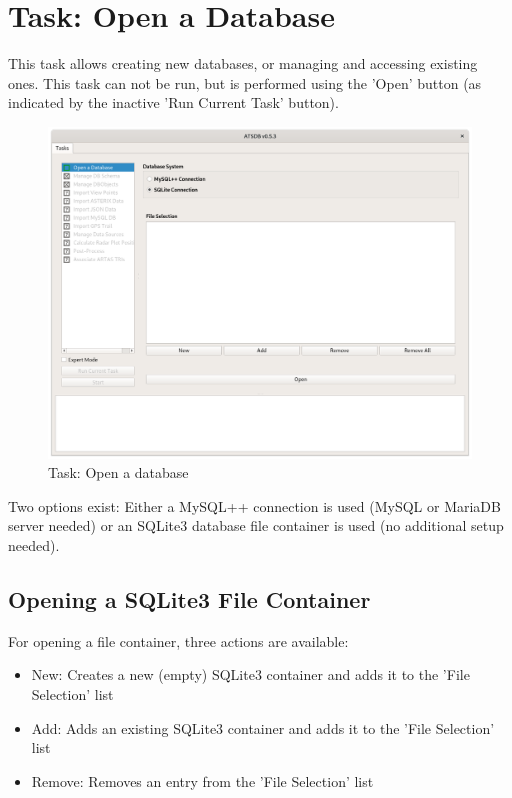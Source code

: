 \section{Task: Open a Database}
\label{sec:task_open_database}

This task allows creating new databases, or managing and accessing existing ones. This task can not be run, but is performed using the 'Open' button (as indicated by the inactive 'Run Current Task' button).

\begin{figure}[H]
  \hspace*{-2.5cm}
    \includegraphics[width=19cm]{../screenshots/task_open_database.png}
  \caption{Task: Open a database}
\end{figure}

Two options exist: Either a MySQL++ connection is used (MySQL or MariaDB server needed) or an SQLite3 database file container is used (no additional setup needed).

\subsection{Opening a SQLite3 File Container}
\label{sec:sqlite_open}
For opening a file container, three actions are available:

\begin{itemize}  
\item New: Creates a new (empty) SQLite3 container and adds it to the 'File Selection' list
\item Add: Adds an existing  SQLite3 container and adds it to the 'File Selection' list
\item Remove: Removes an entry from the 'File Selection' list
\end{itemize}

